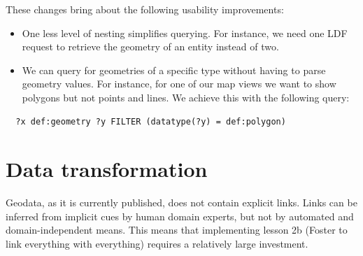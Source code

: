 \documentclass[a4paper]{scrartcl}
\begin{document}
These changes bring about the following usability improvements:

\begin{itemize}
  
\item One less level of nesting simplifies querying.  For instance, we
  need one LDF request to retrieve the geometry of an entity instead
  of two.

\item We can query for geometries of a specific type without having to
  parse geometry values.  For instance, for one of our map views we
  want to show polygons but not points and lines.  We achieve this
  with the following query:

\end{itemize}

\begin{verbatim}
  ?x def:geometry ?y FILTER (datatype(?y) = def:polygon)
\end{verbatim}

\section{Data transformation}
\label{sec:conversion}
\label{sec:enrichment}
\label{sec:transformation}

Geodata, as it is currently published, does not contain explicit
links.  Links can be inferred from implicit cues by human domain
experts, but not by automated and domain-independent means.  This
means that implementing lesson 2b (Foster to link everything with
everything) requires a relatively large investment.
\end{document}
